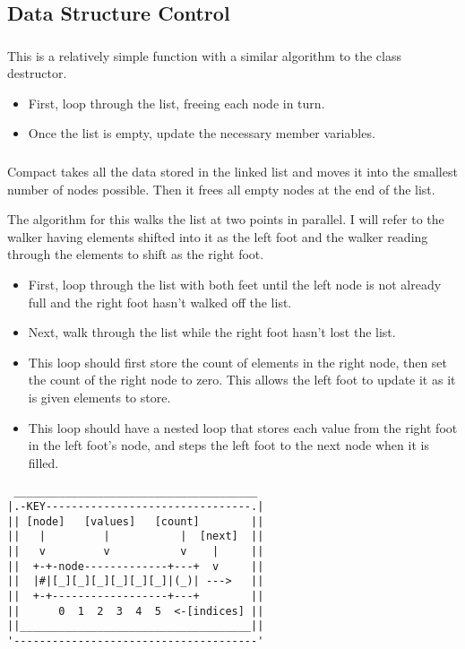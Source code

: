 \subsection{Data Structure Control}

\subsubsection{}
\indent This is a relatively simple function with a similar algorithm to the
class destructor.

\begin{itemize}
	\item First, loop through the list, freeing each node in turn.
	\item Once the list is empty, update the necessary member variables.
\end{itemize}

\subsubsection{}
\indent Compact takes all the data stored in the linked list and moves it into the
smallest number of nodes possible. Then it frees all empty nodes at the
end of the list.

The algorithm for this walks the list at two points in parallel. I will
refer to the walker having elements shifted into it as the left foot and
the walker reading through the elements to shift as the right foot.

\begin{itemize}
	\item First, loop through the list with both feet until the left node is not
	      already full and the right foot hasn't walked off the list.
	\item Next, walk through the list while the right foot hasn't lost the list.

	\item This loop should first store the count of elements in the right node,
	      then set the count of the right node to zero. This allows the left foot
	      to update it as it is given elements to store.
	\item This loop should have a nested loop that stores each value from the right
	      foot in the left foot's node, and steps the left foot to the next node
	      when it is filled.
\end{itemize}


\begin{verbatim}
 ______________________________________  
|.-KEY--------------------------------.| 
|| [node]   [values]   [count]        || 
||   |         |           |  [next]  || 
||   v         v           v    |     || 
||  +-+-node-------------+---+  v     || 
||  |#|[_][_][_][_][_][_]|(_)| --->   || 
||  +-+------------------+---+        || 
||      0  1  2  3  4  5  <-[indices] || 
||____________________________________|| 
'--------------------------------------' 
\end{verbatim}


